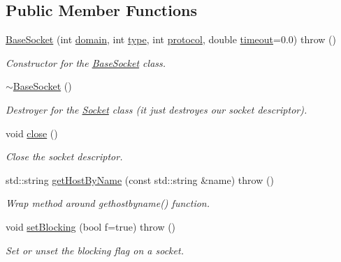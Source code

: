 \subsection*{Public Member Functions}
\begin{CompactItemize}
\item 
\hyperlink{classusock_1_1BaseSocket_5cf4bfad30ea514f522101899592b97f}{BaseSocket} (int \hyperlink{classusock_1_1BaseSocket_a51cae0b366638a5f697f64174135d90}{domain}, int \hyperlink{classusock_1_1BaseSocket_8117d25c7b482eb594d68137868ce5f9}{type}, int \hyperlink{classusock_1_1BaseSocket_09208675b41c416fb402824742963eaa}{protocol}, double \hyperlink{classusock_1_1BaseSocket_b419e8fd0b849c74b73a02d6bd9081e3}{timeout}=0.0)  throw ()
\begin{CompactList}\small\item\em Constructor for the \hyperlink{classusock_1_1BaseSocket}{BaseSocket} class. \item\end{CompactList}\item 
\hyperlink{classusock_1_1BaseSocket_60ad362afb927b4d4e7233c5e9735c7b}{$\sim$BaseSocket} ()
\begin{CompactList}\small\item\em Destroyer for the \hyperlink{classusock_1_1Socket}{Socket} class (it just destroyes our socket descriptor). \item\end{CompactList}\item 
void \hyperlink{classusock_1_1BaseSocket_06383c7ad352244fb0e5e6276e5e86c2}{close} ()
\begin{CompactList}\small\item\em Close the socket descriptor. \item\end{CompactList}\item 
std::string \hyperlink{classusock_1_1BaseSocket_7ffc3a11be4a9d7ba72a1f66f3dbad68}{getHostByName} (const std::string \&name)  throw ()
\begin{CompactList}\small\item\em Wrap method around gethostbyname() function. \item\end{CompactList}\item 
void \hyperlink{classusock_1_1BaseSocket_143722edec56e119495fb8ded76582e5}{setBlocking} (bool f=true)  throw ()
\begin{CompactList}\small\item\em Set or unset the blocking flag on a socket. \item\end{CompactList}\item 

\end{CompactItemize}
